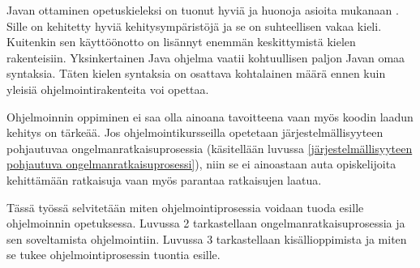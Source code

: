 Javan ottaminen opetuskieleksi on tuonut hyviä ja huonoja asioita mukanaan
\cite{Kolling:2008}. Sille on kehitetty hyviä kehitysympäristöjä ja se on
suhteellisen vakaa kieli. Kuitenkin sen käyttöönotto on lisännyt enemmän
keskittymistä kielen rakenteisiin. Yksinkertainen Java ohjelma vaatii
kohtuullisen paljon Javan omaa syntaksia. Täten kielen syntaksia on osattava
kohtalainen määrä ennen kuin yleisiä ohjelmointirakenteita voi opettaa.

Ohjelmoinnin oppiminen ei saa olla ainoana tavoitteena vaan myös koodin laadun
kehitys on tärkeää. Jos ohjelmointikursseilla opetetaan järjestelmällisyyteen
pohjautuvaa ongelmanratkaisuprosessia (käsitellään luvussa
\ref{järjestelmällisyyteen pohjautuva ongelmanratkaisuprosessi}), niin se ei
ainoastaan auta opiskelijoita kehittämään ratkaisuja vaan myös parantaa
ratkaisujen laatua.

Tässä työssä selvitetään miten ohjelmointiprosessia voidaan tuoda esille
ohjelmoinnin opetuksessa. Luvussa 2 tarkastellaan ongelmanratkaisuprosessia ja
sen soveltamista ohjelmointiin. Luvussa 3 tarkastellaan kisällioppimista ja
miten se tukee ohjelmointiprosessin tuontia esille.
